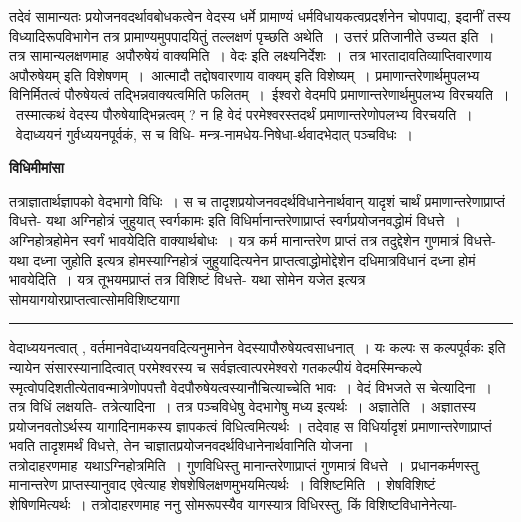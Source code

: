 \documentclass[11pt, openany]{book}
\begin{document}
 तदेवं सामान्यतः प्रयोजनवदर्थावबोधकत्वेन वेदस्य धर्मे प्रामाण्यं धर्मविधायकत्वप्रदर्शनेन चोपपाद्य, इदानीं तस्य विध्यादिरूपविभागेन तत्र प्रामाण्यमुपपादयितुं तल्लक्षणं पृच्छति {\br अथेति~।} उत्तरं प्रतिजानीते {\br उच्यत इति~।} तत्र सामान्यलक्षणमाह\textendash\ {\br अपौरुषेयं वाक्यमिति~।} {\qt वेदः} इति लक्ष्यनिर्देशः~।~तत्र भारतादावतिव्याप्तिवारणाय {\qt अपौरुषेयम्} इति विशेषणम्~।~आत्मादौ तद्दोषवारणाय {\qt वाक्यम्} इति विशेष्यम्~। प्रमाणान्तरेणार्थमुपलभ्य विनिर्मितत्वं पौरुषेयत्वं
तद्भिन्नवाक्यत्वमिति फलितम्~।~ईश्वरो वेदमपि प्रमाणान्तरेणार्थमुपलभ्य विरचयति~।~तस्मात्कथं वेदस्य पौरुषेयाद्भिन्नत्वम् ? न हि वेदं परमेश्वरस्तदर्थं प्रमाणान्तरेणोपलभ्य विरचयति~।~वेदाध्ययनं गुर्वध्ययनपूर्वकं,
\newpage
\fancyhead[RE]{[विधिमीमांसा ]}
{\bl\noindent स च
{\al विधि- मन्त्र-नामधेय-निषेधा-र्थवादभेदात् पञ्चविधः~}।}
\begin{center}
\textbf{विधिमीमांसा}    
\end{center}

{\bl तत्राज्ञा\footnotemark तार्थज्ञापको वेदभागो विधिः~। स च तादृशप्रयोजनवदर्थविधानेनार्थवान् यादृशं चार्थं प्रमाणान्तरेणाप्राप्तं विधत्ते- यथा {\qtl अग्निहोत्रं जुहुयात् स्वर्गकामः} इति विधिर्मानान्तरेणाप्राप्तं स्वर्गप्रयोजनवद्धोमं विधत्ते~। अग्निहोत्रहोमेन स्वर्गं भावयेदिति वाक्यार्थबोधः~। यत्र कर्म मानान्तरेण प्राप्तं तत्र तदुद्देशेन गुणमात्रं विधत्ते- यथा {\qtl दध्ना जुहोति} इत्यत्र होमस्याग्निहोत्रं जुहुयादित्यनेन प्राप्तत्वाद्धोमोद्देशेन दधिमात्रविधानं दध्ना होमं भावयेदिति~। यत्र तूभयमप्राप्तं तत्र विशिष्टं विधत्ते- यथा
{\qtl सोमेन यजेत} इत्यत्र सोमयागयोरप्राप्तत्वात्सोमविशिष्टयागा}\\
\hrule
\vspace{3mm}
\noindent
वेदाध्ययनत्वात् , वर्तमानवेदाध्ययनवदित्यनुमानेन वेदस्यापौरुषेयत्वसाधनात्~। {\qt यः कल्पः स कल्पपूर्वकः} इति न्यायेन संसारस्यानादित्वात् {\qt परमेश्वरस्य च सर्वज्ञत्वात्परमेश्वरो गतकल्पीयं वेदमस्मिन्कल्पे स्मृत्वोपदिशतीत्येतावन्मात्रेणोपपत्तौ वेदपौरुषेयत्वस्यानौचित्याच्चेति भावः~}। वेदं विभजते {\br स चेत्यादिना~।}\\

तत्र विधिं लक्षयति- {\br तत्रेत्यादिना~।} तत्र पञ्चविधेषु वेदभागेषु मध्य इत्यर्थः~। {\br अज्ञातेति~।} अज्ञातस्य प्रयोजनवतोऽर्थस्य यागादिनामकस्य ज्ञापकत्वं विधित्वमित्यर्थः । तदेवाह स विधिर्यादृशं प्रमाणान्तरेणाप्रा\footnotemarkA[1]प्तं भवति तादृशमर्थं विधत्ते, तेन चाज्ञातप्रयोजनवदर्थविधानेनार्थवानिति योजना~। तत्रोदाहरणमाह\textendash\ {\br यथाऽग्निहोत्रमिति~।} गुणविधिस्तु मानान्तरेणाप्राप्तं गुणमात्रं विधत्ते~।~प्रधानकर्मणस्तु मानान्तरेण प्राप्तस्यानुवाद
एवेत्याह शेषशेषिलक्षणमुभयमित्यर्थः~। {\br विशिष्टमिति~।} शेषविशिष्टं शेषिणमित्यर्थः~। तत्रोदाहरणमाह ननु सोमरूपस्यैव यागस्यात्र विधिरस्तु, किं विशिष्टविधानेनेत्या- 
\end{document}
